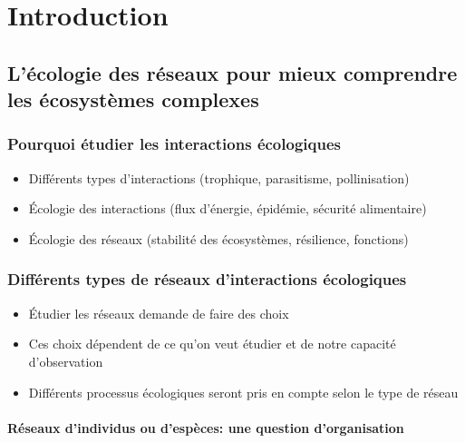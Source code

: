 
\francais   
\doublespacing
\chapter*{Introduction}



\section{L'écologie des réseaux pour mieux comprendre les écosystèmes complexes}

\subsection{Pourquoi étudier les interactions écologiques} 

\begin{itemize}
    \item Différents types d'interactions (trophique, parasitisme, pollinisation)
    \item Écologie des interactions (flux d'énergie, épidémie, sécurité alimentaire)
    \item Écologie des réseaux (stabilité des écosystèmes, résilience, fonctions)
\end{itemize}
  

\subsection{Différents types de réseaux d'interactions écologiques} 

\begin{itemize}
    \item Étudier les réseaux demande de faire des choix 
    \item Ces choix dépendent de ce qu'on veut étudier et de notre capacité d'observation
    \item Différents processus écologiques seront pris en compte selon le type de réseau
\end{itemize}

\subsubsection{Réseaux d'individus ou d'espèces: une question d'organisation} 

